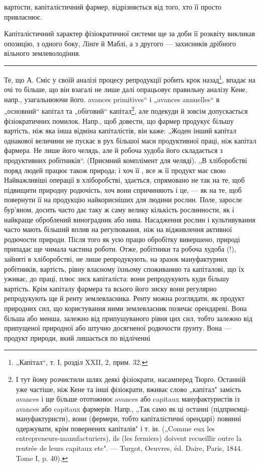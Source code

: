 \parcont{}  %
вартости, капіталістичний фармер, відрізняється від того, хто її просто
привласнює.

Капіталістичний характер фізіократичної системи ще за доби її розквіту
викликав опозицію, з одного боку, Лінґе й Маблі, а з другого —
захисників дрібного вільного землеволодіння.
\pfbreak
Те, що А. Сміс у своїй аналізі процесу репродукції робить крок
назад\footnote{
„Капітал“, т. І, розділ XXII, 2, прим. 32.
}, впадає на очі то більше, що він взагалі не лише далі опрацьовує
правильну аналізу Кене, напр., узагальнюючи його. avances primitives“
і „avances annuelles“ в „основний“ капітал та „обіговий“
капітал\footnote{
І тут йому розчистили шлях деякі фізіократи, насамперед Тюрґо. Останній
уже частіше, ніж Кене та інші фізіократи, вживає слово „капітал" замість avances
і ще більше ототожнює avances або capitaux мануфактуристів із avances або
capitaux фармерів. Напр., „Так само як ці останні (підприємці-мануфактуристи),
вони (фермери, тобто капіталістичні орендарі) повинні одержувати, крім повернених
капіталів" і т. ін. („Comme eux les entrepreneurs-manufacturiers), ils (les fermiers)
doivent recueillir outre la rentrée de leurs capitaux etc". — Turgot, Oeuvres, éd.
Daire, Paris, 1844. Tome I, p. 40).
}, але подекуди й зовсім допускається фізіократичних помилок.
Напр., щоб довести, що фармер продукує більшу вартість, ніж яка інша
відміна капіталістів, він каже: „Жоден інший капітал однакової величини
не пускає в рух більшої маси продуктивної праці, ніж капітал фармера.
Не лише його челядь, але й робоча худоба його складається з продуктивних
робітників“. (Приємний комплімент для челяді). „В хліборобстві
поряд людей працює також природа; і хоч її , все ж її продукт має свою 
Найважливіші операції в хліборобстві, здається, спрямовано не так на те,
щоб підвищити природну родючість, хоч вони спричиняють і це, — як
на те, щоб повернути її на продукцію найкорисніших для людини рослин.
Поле, заросле бур’яном, досить часто дає таку ж саму велику
кількість рослинности, як і найкраще оброблений виноградник або
нива. Насадження рослин і культивування часто мають більший вплив на
регулювання, ніж на відживлення активної родючости природи. Після
того як усю працю обробітку вивершено, природі припадає ще чимала
частина роботи. Отже, робітники та робоча худоба (!), зайняті в хліборобстві,
не лише репродукують, на зразок мануфактурних робітників,
вартість, рівну власному їхньому споживанню та капіталові, що їх уживає,
до праці, плюс зиск капіталіста: вони репродукують куди більшу вартість.
Крім капіталу фармера та всього його зиску вони регулярно репродукують
ще й ренту землевласника. Ренту можна розглядати, як продукт
природних сил, що користування ними землевласник позичає орендареві.
Вона більша або менша, залежно від припушуваного рівня цих сил,
тобто залежно від припущеної природної або штучно досягненої родючости
ґрунту. Вона — продукт природи, який лишається по відліченні
\parbreak{}  %
